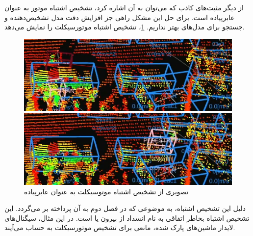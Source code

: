 از دیگر مثبت‌های کاذب که می‌توان به آن اشاره کرد، تشخیص اشتباه موتور به عنوان عابر‌پیاده است. برای حل این مشکل راهی جز افزایش دقت مدل تشخیص‌دهنده و جستجو برای مدل‌های بهتر نداریم.
\cref{fig:DT_Occlusion_False_Positive}، تشخیص اشتباه موتورسیکلت را نمایش می‌دهد.\begin{figure}[h!]
    \centering
    \begin{minipage}{0.8\textwidth}
        \includegraphics[width=1\linewidth]{figures/Motorbike_TP.png}
    \end{minipage}
    \vspace{0.3cm}
    \begin{minipage}{0.8\textwidth}
        \includegraphics[width=1\linewidth]{figures/Motorbike_Occlusion_FP.png}
    \end{minipage}
    \caption{تصویری از تشخیص اشتباه موتوسیکلت به عنوان عابرپیاده}
    \label{fig:DT_Occlusion_False_Positive}
\end{figure} دلیل این تشخیص اشتباه، به موضوعی که در فصل دوم به آن پرداخته بر می‌گردد. این تشخیص اشتباه بخاطر اتفاقی به نام انسداد از بیرون یا  است. در این مثال، سیگنال‌های لایدار ماشین‌های پارک‌ شده، مانعی برای تشخیص موتورسیکلت به حساب می‌آیند.